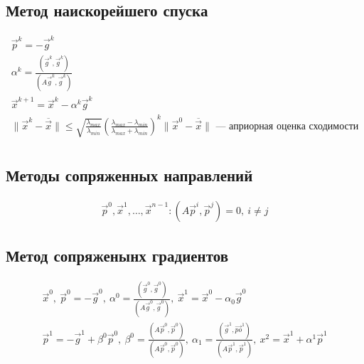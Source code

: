 \subsection{Метод наискорейшего спуска}
\begin{gather*}
  \vec{p}^k = -\vec{g}^k \\
  \alpha^k = \frac{(\vec{g}^k, \vec{g}^k)}{(A \vec{g}^k, \vec{g}^k)} \\
  \vec{x}^{k + 1} = \vec{x}^k - \alpha^k \vec{g}^k \\
  \|\vec{x}^k - \overline{\vec{x}}\| \leq
  \sqrt{\frac{\lambda_{max}}{\lambda_{min}}} (\frac{\lambda_{max} -
    \lambda_{min}}{\lambda_{max} + \lambda_{min}})^k \|\vec{x}^0
  -\overline{\vec{x}}\| \text{ --- априорная оценка сходимости}\\
\end{gather*}

\subsection{Методы сопряженных направлений}
\begin{gather*}
   \vec{p}^0, \vec{x}^1, \dotsc, \vec{x}^{n - 1} : (A\vec{p}^i, \vec{p}^j) = 0,\
   i \neq j
\end{gather*}

\subsection{Метод сопряженынх градиентов}
\begin{gather*}
  \vec{x}^0,\ \vec{p}^0 = -\vec{g}^0,\ \alpha^0 = \frac{(\vec{g}^0,
    \vec{g}^0)}{(A\vec{g}^0, \vec{g}^0)},\ \vec{x}^1 = \vec{x}^0 - \alpha_0
  \vec{g}^0 \\ 
  \vec{p}^1 = -\vec{g}^1 + \beta^0 \vec{p}^0,\ \beta^0 =
  \frac{(A\vec{p}^0, \vec{p}^0)}{(A\vec{p}^0, \vec{p}^0)},\ \alpha_1 =
  \frac{(\vec{g}^1, \vec{po}^1)}{(A\vec{p}^1, \vec{p}^1)},\ x^2 = \vec{x}^1 +
  \alpha^1 \vec{p}^1\\
  
\end{gather*}
